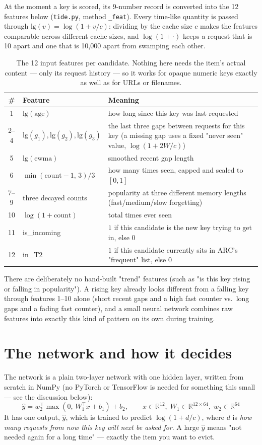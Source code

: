\documentclass[10pt,a4paper]{article}
\newcommand{\code}[1]{\texttt{#1}}
\begin{document}
At the moment a key is scored, its 9-number record is converted into the 12 features below
(\code{tide.py}, method \code{\_feat}). Every time-like quantity is passed through
$\text{lg}(v) = \log(1 + v/c)$: dividing by the cache size $c$ makes the features comparable across
different cache sizes, and $\log(1+\cdot)$ keeps a request that is 10 apart and one that is 10{,}000 apart
from swamping each other.

\begin{table}[H]
\centering\small
\begin{tabular}{clp{8.3cm}}
\toprule
\# & Feature & Meaning \\
\midrule
1 & $\text{lg}(\text{age})$ & how long since this key was last requested \\
2--4 & $\text{lg}(g_1), \text{lg}(g_2), \text{lg}(g_3)$ & the last three gaps between requests for this key (a missing gap uses a fixed "never seen" value, $\log(1+2W/c)$) \\
5 & $\text{lg}(\text{ewma})$ & smoothed recent gap length \\
6 & $\min(\text{count}-1,\,3)/3$ & how many times seen, capped and scaled to $[0,1]$ \\
7--9 & three decayed counts & popularity at three different memory lengths (fast/medium/slow forgetting) \\
10 & $\log(1+\text{count})$ & total times ever seen \\
11 & is\_incoming & $1$ if this candidate is the new key trying to get in, else $0$ \\
12 & in\_T2 & $1$ if this candidate currently sits in ARC's "frequent" list, else $0$ \\
\bottomrule
\end{tabular}
\caption{The 12 input features per candidate. Nothing here needs the item's actual content --- only its
request history --- so it works for opaque numeric keys exactly as well as for URLs or filenames.}
\end{table}

There are deliberately no hand-built "trend" features (such as "is this key rising or falling in
popularity"). A rising key already looks different from a falling key through features 1--10 alone (short
recent gaps and a high fast counter vs.\ long gaps and a fading fast counter), and a small neural network
combines raw features into exactly this kind of pattern on its own during training.

\section{The network and how it decides}
The network is a plain two-layer network with one hidden layer, written from scratch in NumPy (no
PyTorch or TensorFlow is needed for something this small --- see the discussion below):
\[
\hat{y} = w_2^\top \max(0,\, W_1^\top x + b_1) + b_2 ,\qquad x \in \mathbb{R}^{12},\; W_1 \in
\mathbb{R}^{12\times 64},\; w_2 \in \mathbb{R}^{64}
\]
It has one output, $\hat{y}$, which is trained to predict $\log(1 + d/c)$, where $d$ is \emph{how many
requests from now this key will next be asked for}. A large $\hat{y}$ means "not needed again for a long
time" --- exactly the item you want to evict.
\end{document}
